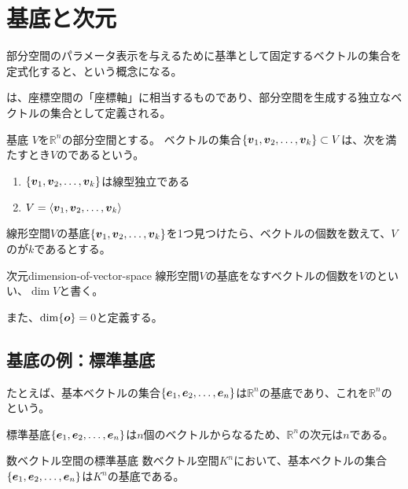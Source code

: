 \documentclass[../../../topic_linear-algebra]{subfiles}
\begin{document}
\sectionline
\section{基底と次元}

部分空間のパラメータ表示を与えるために基準として固定するベクトルの集合を定式化すると、という概念になる。

\br

は、座標空間の「座標軸」に相当するものであり、部分空間を生成する独立なベクトルの集合として定義される。

\begin{definition*}{基底}
  $V$を$\mathbb{R}^n$の部分空間とする。
  ベクトルの集合$\{ \vb*{v}_1, \vb*{v}_2, \dots, \vb*{v}_k \} \subset V$は、次を満たすとき$V$のであるという。
  \begin{enumerate}[label=\romanlabel]
    \item $\{ \vb*{v}_1, \vb*{v}_2, \dots, \vb*{v}_k \}$は線型独立である
    \item $V = \langle \vb*{v}_1, \vb*{v}_2, \dots, \vb*{v}_k \rangle$
  \end{enumerate}
\end{definition*}

\br

線形空間$V$の基底$\{ \vb*{v}_1, \vb*{v}_2, \dots, \vb*{v}_k \}$を1つ見つけたら、ベクトルの個数を数えて、$V$のが$k$であるとする。

\begin{definition}{次元}{dimension-of-vector-space}
  線形空間$V$の基底をなすベクトルの個数を$V$のといい、$\dim V$と書く。

  また、$\dim\{\vb*{o}\} = 0$と定義する。
\end{definition}

\subsection{基底の例：標準基底}

たとえば、基本ベクトルの集合$\{ \vb*{e}_1, \vb*{e}_2, \dots, \vb*{e}_n \}$は$\mathbb{R}^n$の基底であり、これを$\mathbb{R}^n$のという。

標準基底$\{ \vb*{e}_1, \vb*{e}_2, \dots, \vb*{e}_n \}$は$n$個のベクトルからなるため、$\mathbb{R}^n$の次元は$n$である。

\begin{theorem*}{数ベクトル空間の標準基底}
  数ベクトル空間$K^n$において、基本ベクトルの集合$\{ \vb*{e}_1, \vb*{e}_2, \dots, \vb*{e}_n \}$は$K^n$の基底である。
\end{theorem*}
\end{document}
